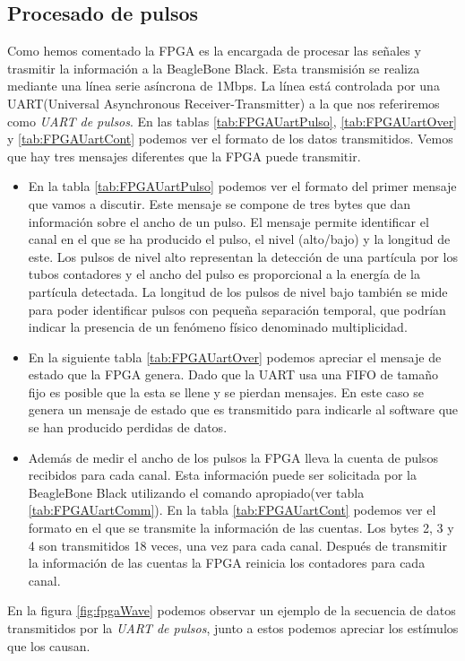 	\subsection{Procesado de pulsos}
		Como hemos comentado la FPGA es la encargada de procesar las señales y trasmitir la información a la BeagleBone Black. Esta transmisión
		se realiza mediante una línea serie asíncrona de 1Mbps. La línea está controlada por una UART(Universal Asynchronous
		Receiver-Transmitter) a la que nos referiremos como \emph{UART de pulsos}. En las tablas \ref{tab:FPGAUartPulso},
		\ref{tab:FPGAUartOver} y \ref{tab:FPGAUartCont} podemos ver el formato de los datos transmitidos. Vemos que hay tres mensajes
		diferentes que la FPGA puede transmitir.
		\begin{itemize}
			\item	En la tabla \ref{tab:FPGAUartPulso} podemos ver el formato del primer mensaje que vamos a discutir. Este mensaje se
				compone de tres bytes que dan información sobre el ancho de un pulso. El mensaje permite identificar el canal en el
				que se ha producido el pulso, el nivel (alto/bajo) y la longitud de este. Los pulsos de nivel alto representan la
				detección de una partícula por los tubos contadores y el ancho del pulso es proporcional a la energía de la partícula
				detectada. La longitud de los pulsos de nivel bajo también se mide para poder identificar pulsos con pequeña
				separación temporal, que podrían indicar la presencia de un fenómeno físico denominado multiplicidad.
			\item 	En la siguiente tabla \ref{tab:FPGAUartOver} podemos apreciar el mensaje de estado que la FPGA genera. Dado que la UART usa
				una FIFO de tamaño fijo es posible que la esta se llene y se pierdan mensajes. En este caso se genera un mensaje de
				estado que es transmitido para indicarle al software que se han producido perdidas de datos.
			\item	Además de medir el ancho de los pulsos la FPGA lleva la cuenta de pulsos recibidos para cada canal. Esta información
				puede ser solicitada por la BeagleBone Black utilizando el comando apropiado(ver tabla \ref{tab:FPGAUartComm}). En la
				tabla \ref{tab:FPGAUartCont} podemos ver el formato en el que se transmite la información de las cuentas. Los bytes 2,
				3 y 4 son transmitidos 18 veces, una vez para cada canal. Después de transmitir la información de las cuentas la FPGA
				reinicia los contadores para cada canal.
		\end{itemize}
		En la figura \ref{fig:fpgaWave} podemos observar un ejemplo de la secuencia de datos transmitidos por la \emph{UART de pulsos}, junto a
		estos podemos apreciar los estímulos que los causan. 

